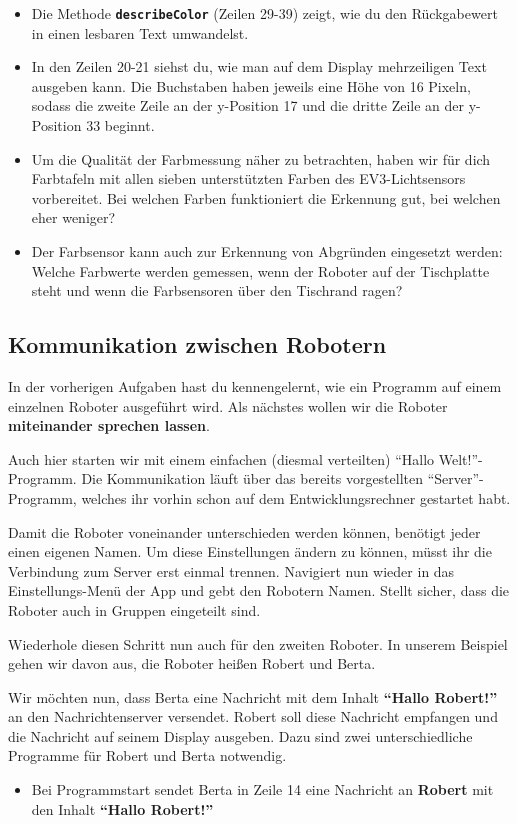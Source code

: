 \documentclass[
	12pt,
	colorbacktitle,
	accentcolor=tud1c,
	draft,
	twoside,
	german
]{tudexercise}
\newcommand{\solpath}[0]{../../impl/androidApp/app/src/main/java/org/mindroid/android/app/programs/workshop/solutions}
\newcommand{\bfcode}[1]{\texttt{\textbf{#1}}}
\begin{document}
	
	
	\begin{itemize}
	\item Die Methode \bfcode{describeColor} (Zeilen 29-39) zeigt, wie du den Rückgabewert in einen lesbaren Text umwandelst.
	\item In den Zeilen 20-21 siehst du, wie man auf dem Display mehrzeiligen Text ausgeben kann. Die Buchstaben haben jeweils eine Höhe von 16 Pixeln, sodass die zweite Zeile an der y-Position 17 und die dritte Zeile an der y-Position 33 beginnt.
	\item Um die Qualität der Farbmessung näher zu betrachten, haben wir für dich Farbtafeln mit allen sieben unterstützten Farben des EV3-Lichtsensors vorbereitet. Bei welchen Farben funktioniert die Erkennung gut, bei welchen eher weniger?
	\item Der Farbsensor kann auch zur Erkennung von Abgründen eingesetzt werden: Welche Farbwerte werden gemessen, wenn der Roboter auf der Tischplatte steht und wenn die Farbsensoren über den Tischrand ragen?
	\end{itemize}
	
	\subsection{Kommunikation zwischen Robotern} %
	In der vorherigen Aufgaben hast du kennengelernt, wie ein Programm auf einem einzelnen Roboter ausgeführt wird. Als nächstes wollen wir die Roboter \textbf{miteinander sprechen lassen}.
	
	Auch hier starten wir mit einem einfachen (diesmal verteilten) “Hallo Welt!”-Programm. Die Kommunikation läuft über das bereits vorgestellten “Server”-Programm, welches ihr vorhin schon auf dem Entwicklungsrechner gestartet habt. 
	
	Damit die Roboter voneinander unterschieden werden können, benötigt jeder einen eigenen Namen. Um diese Einstellungen ändern zu können, müsst ihr die Verbindung zum Server erst einmal trennen. Navigiert nun wieder in das Einstellungs-Menü der App und gebt den Robotern Namen. Stellt sicher, dass die Roboter auch in Gruppen eingeteilt sind. 
	
	Wiederhole diesen Schritt nun auch für den zweiten Roboter. In unserem Beispiel gehen wir davon aus, die Roboter heißen Robert und Berta.
	
	Wir möchten nun, dass Berta eine Nachricht mit dem Inhalt \textbf{``Hallo Robert!''} an den Nachrichtenserver versendet. Robert soll diese Nachricht empfangen und die Nachricht auf seinem Display ausgeben. 
	Dazu sind zwei unterschiedliche Programme für Robert und Berta notwendig.
	
	\begin{itemize}
	\item Bei Programmstart sendet Berta in Zeile 14 eine Nachricht an \textbf{Robert }mit den Inhalt \textbf{``Hallo Robert!''}
	\end{itemize}
	
\end{document}
